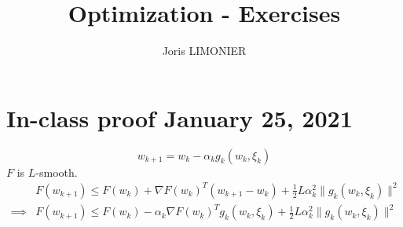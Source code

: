 \documentclass{article}
\title{Optimization - Exercises}
\author{Joris LIMONIER}
\newcommand{\1}{\mathbf{1}}
\begin{document}
\maketitle
\tableofcontents

\section{In-class proof January 25, 2021}
\begin{equation*}
  w_{k+1} = w_k - \alpha_k g_k(w_k, \xi_k)
\end{equation*}
\(F\) is \(L\)-smooth.
\begin{align*}
           &
  F(w_{k+1}) \leq F(w_k) + \nabla F(w_k)^T (w_{k+1} - w_k) + \frac{1}{2} L \alpha_k^2 \|g_k(w_k, \xi_k)\|^2          \\
  \implies &
  F(w_{k+1}) \leq F(w_k) - \alpha_k \nabla F(w_k)^T g_k (w_k, \xi_k) + \frac{1}{2} L \alpha_k^2 \|g_k(w_k, \xi_k)\|^2 \\
\end{align*}
\end{document}
